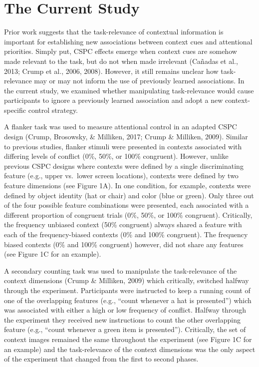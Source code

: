 \documentclass[english,,man,floatsintext]{apa6}
\begin{document}
\hypertarget{the-current-study}{%
\section{The Current Study}\label{the-current-study}}

Prior work suggests that the task-relevance of contextual information is important for establishing new associations between context cues and attentional priorities. Simply put, CSPC effects emerge when context cues are somehow made relevant to the task, but do not when made irrelevant (Cañadas et al., 2013; Crump et al., 2006, 2008). However, it still remains unclear how task-relevance may or may not inform the use of previously learned associations. In the current study, we examined whether manipulating task-relevance would cause participants to ignore a previously learned association and adopt a new context-specific control strategy.

A flanker task was used to measure attentional control in an adapted CSPC design (Crump, Brosowsky, \& Milliken, 2017; Crump \& Milliken, 2009). Similar to previous studies, flanker stimuli were presented in contexts associated with differing levels of conflict (0\%, 50\%, or 100\% congruent). However, unlike previous CSPC designs where contexts were defined by a single discriminating feature (e.g., upper vs.~lower screen locations), contexts were defined by two feature dimensions (see Figure 1A). In one condition, for example, contexts were defined by object identity (hat or chair) and color (blue or green). Only three out of the four possible feature combinations were presented, each associated with a different proportion of congruent trials (0\%, 50\%, or 100\% congruent). Critically, the frequency unbiased context (50\% congruent) always shared a feature with each of the frequency-biased contexts (0\% and 100\% congruent). The frequency biased contexts (0\% and 100\% congruent) however, did not share any features (see Figure 1C for an example).

A secondary counting task was used to manipulate the task-relevance of the context dimensions (Crump \& Milliken, 2009) which critically, switched halfway through the experiment. Participants were instructed to keep a running count of one of the overlapping features (e.g., \enquote{count whenever a hat is presented}) which was associated with either a high or low frequency of conflict. Halfway through the experiment they received new instructions to count the other overlapping feature (e.g., \enquote{count whenever a green item is presented}). Critically, the set of context images remained the same throughout the experiment (see Figure 1C for an example) and the task-relevance of the context dimensions was the only aspect of the experiment that changed from the first to second phases.
\end{document}
